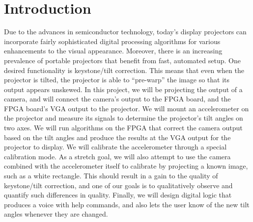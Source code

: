 \documentclass{article}
\begin{document}
\maketitle


\section{Introduction}
Due to the advances in semiconductor technology, today's display projectors can incorporate fairly sophisticated digital processing algorithms for various enhancements to the visual appearance.
Moreover, there is an increasing prevalence of portable projectors that benefit from fast, automated setup.
One desired functionality is keystone/tilt correction.
This means that even when the projector is tilted, the projector is able to ``pre-warp'' the image so that its output appears unskewed.
In this project, we will be projecting the output of a camera, and will connect the camera's output to the FPGA board, and the FPGA board's VGA output to the projector.
We will mount an accelerometer on the projector and measure its signals to determine the projector's tilt angles on two axes.
We will run algorithms on the FPGA that correct the camera output based on the tilt angles and produce the results at the VGA output for the projector to display.
We will calibrate the accelerometer through a special calibration mode.
As a stretch goal, we will also attempt to use the camera combined with the accelerometer itself to calibrate by projecting a known image, such as a white rectangle.
This should result in a gain to the quality of keystone/tilt correction, and one of our goals is to qualitatively observe and quantify such differences in quality.
Finally, we will design digital logic that produces a voice with help commands, and also lets the user know of the new tilt angles whenever they are changed.
\end{document}
